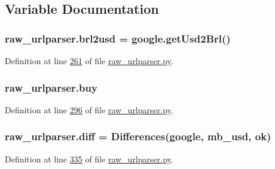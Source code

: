 \subsection{Variable Documentation}
\subsubsection[{\texorpdfstring{brl2usd}{brl2usd}}]{\setlength{\rightskip}{0pt plus 5cm}raw\+\_\+urlparser.\+brl2usd = google.\+get\+Usd2\+Brl()}\hypertarget{namespaceraw__urlparser_ae7e1c02df9ab0102e017e31885aa6431}{}\label{namespaceraw__urlparser_ae7e1c02df9ab0102e017e31885aa6431}


Definition at line \hyperlink{raw__urlparser_8py_source_l00261}{261} of file \hyperlink{raw__urlparser_8py_source}{raw\+\_\+urlparser.\+py}.

\subsubsection[{\texorpdfstring{buy}{buy}}]{\setlength{\rightskip}{0pt plus 5cm}raw\+\_\+urlparser.\+buy}\hypertarget{namespaceraw__urlparser_a2b9c66c8d5157cd95ecb738719c8a873}{}\label{namespaceraw__urlparser_a2b9c66c8d5157cd95ecb738719c8a873}


Definition at line \hyperlink{raw__urlparser_8py_source_l00296}{296} of file \hyperlink{raw__urlparser_8py_source}{raw\+\_\+urlparser.\+py}.

\subsubsection[{\texorpdfstring{diff}{diff}}]{\setlength{\rightskip}{0pt plus 5cm}raw\+\_\+urlparser.\+diff = {\bf Differences}({\bf google}, {\bf mb\+\_\+usd}, {\bf ok})}\hypertarget{namespaceraw__urlparser_a86dc49fc55812ccc7eeda441b0fce83c}{}\label{namespaceraw__urlparser_a86dc49fc55812ccc7eeda441b0fce83c}


Definition at line \hyperlink{raw__urlparser_8py_source_l00335}{335} of file \hyperlink{raw__urlparser_8py_source}{raw\+\_\+urlparser.\+py}.

